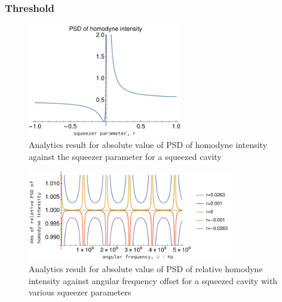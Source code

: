 \documentclass[aps,pra,superscriptaddress,reprint,nofootinbib]{revtex4-1}
\begin{document}
\subsubsection{Threshold}

\begin{figure}
	\begin{center}
	\includegraphics[width=0.6\textwidth]{figures/not_main_PSD_vs_r.pdf}
	\end{center}
	\caption{Analytics result for absolute value of PSD of homodyne intensity against the squeezer parameter for a squeezed cavity}
	\label{fig:not_main_PSD_vs_r}
\end{figure}

\begin{figure}
	\begin{center}
	\includegraphics[width=0.8\textwidth]{figures/not_main_PSD_vs_freq.pdf}
	\end{center}
	\caption{Analytics result for absolute value of PSD of relative homodyne intensity against angular frequency offset for a squeezed cavity with various squeezer parameters}
	\label{fig:not_main_PSD_vs_freq}
\end{figure}
\end{document}
